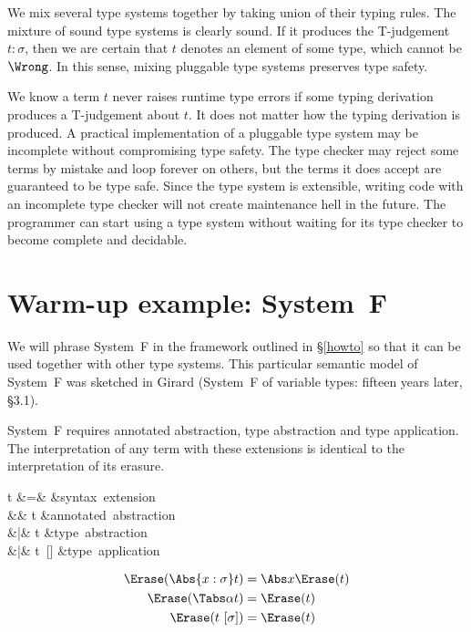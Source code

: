 \documentclass{amsart}
\begin{document}
We mix several type systems together by taking union of their
typing rules. The mixture of sound type systems is clearly sound.
If it produces the T-judgement $t:\sigma$, then we are
certain that $t$ denotes an element of some type, which cannot be
$\Wrong$. In this sense, mixing pluggable type systems preserves
type safety.

We know a term $t$ never raises runtime type errors if some
typing derivation produces a T-judgement about $t$. It does
not matter how the typing derivation is produced. A practical
implementation of a pluggable type system may be incomplete
without compromising type safety. The type checker may reject
some terms by mistake and loop forever on others, but the terms
it does accept are guaranteed to be type safe. Since the type
system is extensible, writing code with an incomplete type
checker will not create maintenance hell in the future. The
programmer can start using a type system without waiting for its
type checker to become complete and decidable.



\section{Warm-up example: System~F}

We will phrase System~F in the framework outlined in
\S\ref{howto} so that it can be used together with other type
systems. This particular semantic model of System~F was sketched
in Girard (System~F of variable types: fifteen years later,
\S3.1).


System~F requires annotated abstraction, type abstraction and
type application. The interpretation of any term with these
extensions is identical to the interpretation of its erasure.

\begin{syntax}
t &\+=& &\mbox{syntax extension} \\
&& t &\mbox{annotated abstraction}\\
&|& \Tabs\alpha t &\mbox{type abstraction}\\
&|& t~[\sigma] &\mbox{type application}
\end{syntax}%

\begin{align*}
\Erase(\Abs{x:\sigma}t) & = \Abs x\Erase(t) \\
\Erase(\Tabs\alpha t) &= \Erase(t) \\
\Erase(t~[\sigma]) &= \Erase(t)
\end{align*}
\end{document}
